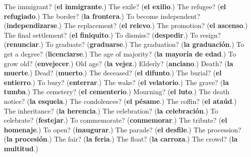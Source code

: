 \begin{tcolorbox}[breakable,colback=teal!4,colframe=teal!35!black,title={Before you move on}]
The immigrant? (\textbf{el inmigrante}.) The exile? (\textbf{el exilio}.) The refugee? (\textbf{el refugiado}.) The border? (\textbf{la frontera}.) To become independent? (\textbf{independizarse}.) The replacement? (\textbf{el relevo}.) The promotion? (\textbf{el ascenso}.) The final settlement? (\textbf{el finiquito}.) To dismiss? (\textbf{despedir}.) To resign? (\textbf{renunciar}.) To graduate? (\textbf{graduarse}.) The graduation? (\textbf{la graduación}.) To get a degree? (\textbf{licenciarse}.) The age of majority? (\textbf{la mayoría de edad}.) To grow old? (\textbf{envejecer}.) Old age? (\textbf{la vejez}.) Elderly? (\textbf{anciano}.) Death? (\textbf{la muerte}.) Dead? (\textbf{muerto}.) The deceased? (\textbf{el difunto}.) The burial? (\textbf{el entierro}.) To bury? (\textbf{enterrar}.) The wake? (\textbf{el velatorio}.) The grave? (\textbf{la tumba}.) The cemetery? (\textbf{el cementerio}.) Mourning? (\textbf{el luto}.) The death notice? (\textbf{la esquela}.) The condolences? (\textbf{el pésame}.) The coffin? (\textbf{el ataúd}.) The inheritance? (\textbf{la herencia}.) The celebration? (\textbf{la celebración}.) To celebrate? (\textbf{festejar}.) To commemorate? (\textbf{conmemorar}.) The tribute? (\textbf{el homenaje}.) To open? (\textbf{inaugurar}.) The parade? (\textbf{el desfile}.) The procession? (\textbf{la procesión}.) The fair? (\textbf{la feria}.) The float? (\textbf{la carroza}.) The crowd? (\textbf{la multitud}.)
\end{tcolorbox}
